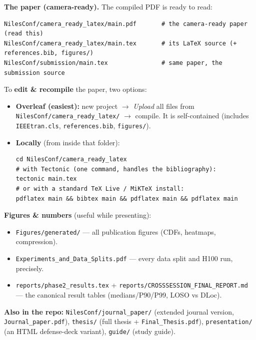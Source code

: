 \documentclass[11pt]{article}
\begin{document}
\textbf{The paper (camera-ready).} The compiled PDF is ready to read:
\begin{lstlisting}
NilesConf/camera_ready_latex/main.pdf       # the camera-ready paper (read this)
NilesConf/camera_ready_latex/main.tex       # its LaTeX source (+ references.bib, figures/)
NilesConf/submission/main.tex               # same paper, the submission source
\end{lstlisting}
To \textbf{edit \& recompile} the paper, two options:
\begin{itemize}[nosep,leftmargin=1.4em]
\item \textbf{Overleaf (easiest):} new project $\rightarrow$ \emph{Upload} all files from
      \texttt{NilesConf/camera\_ready\_latex/} $\rightarrow$ compile. It is self-contained
      (includes \texttt{IEEEtran.cls}, \texttt{references.bib}, \texttt{figures/}).
\item \textbf{Locally} (from inside that folder):
\begin{lstlisting}
cd NilesConf/camera_ready_latex
# with Tectonic (one command, handles the bibliography):
tectonic main.tex
# or with a standard TeX Live / MiKTeX install:
pdflatex main && bibtex main && pdflatex main && pdflatex main
\end{lstlisting}
\end{itemize}

\textbf{Figures \& numbers} (useful while presenting):
\begin{itemize}[nosep,leftmargin=1.4em]
\item \texttt{Figures/generated/} --- all publication figures (CDFs, heatmaps, compression).
\item \texttt{Experiments\_and\_Data\_Splits.pdf} --- every data split and H100 run, precisely.
\item \texttt{reports/phase2\_results.tex} + \texttt{reports/CROSSSESSION\_FINAL\_REPORT.md}
      --- the canonical result tables (medians/P90/P99, LOSO vs DLoc).
\end{itemize}

\textbf{Also in the repo:} \texttt{NilesConf/journal\_paper/} (extended journal version,
\texttt{Journal\_paper.pdf}), \texttt{thesis/} (full thesis + \texttt{Final\_Thesis.pdf}),
\texttt{presentation/} (an HTML defense-deck variant), \texttt{guide/} (study guide).

\end{document}

